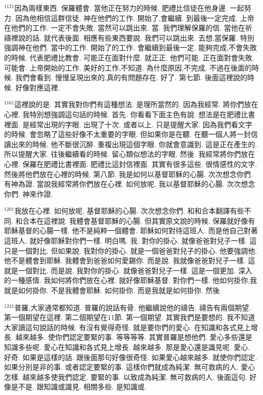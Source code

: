 \documentclass{book}
\begin{document}
$^{1121}$因為兩樣東西.
保羅體會.
當他正在努力的時候.
肥禮比信徒在他身邊.
一起努力.
因為他相信這群信徒.
神在他們的工作.
開始了,會繼續.
到最後一定完成.
上帝在他們的工作.
一定不會失敗.
當然可以跳出來.
當.
我們理解保羅的信.
當他在祈禱裡說的話.
就代表後面.
相應有些東西要說.
我們可以跳出來.
去想,當保羅.
特別強調神在他們.
當中的工作.
開始了的工作.
會繼續到最後一定.
能夠完成,不會失敗的時候.
代表肥禮比教會.
可能正在面對什麼.
就正正.
他們可能.
正在面對會失敗.
可能會.
上帝開始的工作.
美好的工作,不知道.
為什麼原因,不完成.
不過在後面的時候.
我們會看到.
慢慢呈現出來的,真的有問題存在.
好了.
第七節.
後面這裡說的時候.
好像對應這裡.

$^{1161}$這裡說的是.
其實我對你們有這種想法.
是理所當然的.
因為我經常.
將你們放在心裡.
我特別想強調這句話的時候.
首先.
你看看下面主色有說.
想法是在肥禮比書裡面.
是經常出現的字眼.
出現了十次.
或者以上.
只是提醒大家.
因為我們看文字的時候.
會忽略了這些好像不太重要的字眼.
但如果你是在聽.
在聽一個人將一封信讀出來的時候.
他不斷很沉醉.
重複出現這個字眼.
你就會意識到.
這是正在產生的.
所以提醒大家.
往後繼續看的時候.
留心類似想法的字眼.
然後.
我經常將你們放在心裡.
保羅在肥禮比書裡面.
肥禮比這封信裡面.
其實有很多這些.
很情感性的文字.
然後將他們放在心裡的時候.
第八節.
我是如何以基督耶穌的心腸.
次次想念你們.
有神為證.
當說我經常將你們放在心裡.
如何放呢.
我以基督耶穌的心腸.
次次想念你們.
神來作證.

$^{1201}$我放在心裡.
如何放呢.
基督耶穌的心腸.
次次想念你們.
和和合本翻譯有些不同.
和合本在這裡說.
我體會基督耶穌的心腸.
但其實原文說的時候.
保羅就好像有耶穌基督的心腸一樣.
他不是純粹一個體會.
耶穌如何對待這班人.
而是他自己對著這班人.
就好像耶穌對你們一樣.
明白嗎.
我.
對你的掛心.
就像爸爸對兒子一樣.
這只是一個對比.
但如果說.
我對你的掛心.
就是一個爸爸對兒子的掛心.
他要強調他.
他不是體會到耶穌.
我體會到爸爸如何愛錫你.
而是說.
我就像爸爸對兒子一樣.
這就是一個對比.
而是說.
我對你的掛心.
就像爸爸對兒子一樣.
這是一個更加.
深入的一種感情.
我如何將你們放在心裡.
就好像耶穌基督.
對你們一樣.
他如何掛你,我就是如何掛你.
不是我體會耶穌.
如何掛你.
而是我就是如何掛你.
然後.

$^{1241}$普羅,大家通常都知道.
普羅的說話有骨.
他繼續說他的禱告.
禱告有兩個期望.
第一個期望在這裡.
第二個期望在11節.
第一個期望.
其實我們是要想的.
我不知道大家讀這句說話的時候.
有沒有覺得奇怪.
就是要你們的愛心.
在知識和各式見上增長.
越來越多.
使你們認定要緊的事.
等等等等.
其實普羅是想他們.
愛心多些還是知識多些呢.
愛心在知識和各式見上增長.
越來越多.
那是愛心還是識見呢.
愛心.
好奇.
如果是這樣的話.
跟後面那句好像很奇怪.
如果愛心越來越多.
就使你們認定.
如果分別是非的事.
或者認定要緊的事.
這樣你們就成為純潔.
無可救病的人.
愛心怎樣.
越來越多使我們認定.
要緊的事.
以致成為純潔.
無可救病的人.
後面這句.
好像是不是.
跟知識或識見.
相關多些.
是知識或.
\end{document}
